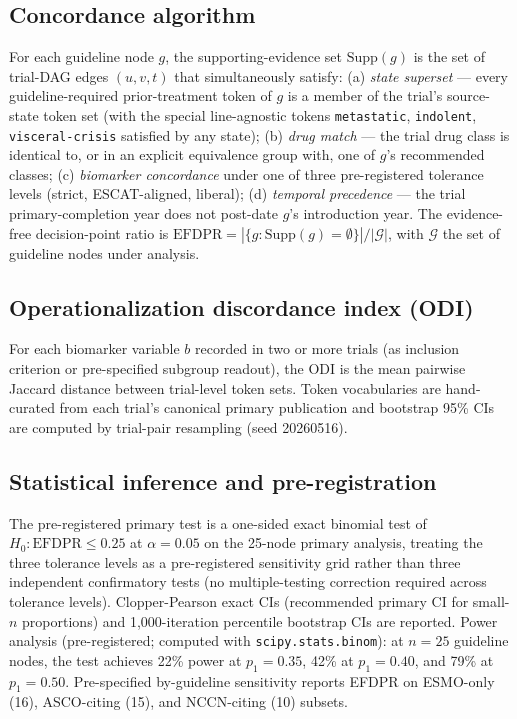 \documentclass[11pt,a4paper]{article}
\begin{document}
\subsection{Concordance algorithm}
For each guideline node $g$, the supporting-evidence set $\mathrm{Supp}(g)$ is the set of trial-DAG edges $(u, v, t)$ that simultaneously satisfy: (a) \emph{state superset} --- every guideline-required prior-treatment token of $g$ is a member of the trial's source-state token set (with the special line-agnostic tokens \texttt{metastatic}, \texttt{indolent}, \texttt{visceral-crisis} satisfied by any state); (b) \emph{drug match} --- the trial drug class is identical to, or in an explicit equivalence group with, one of $g$'s recommended classes; (c) \emph{biomarker concordance} under one of three pre-registered tolerance levels (strict, ESCAT-aligned, liberal); (d) \emph{temporal precedence} --- the trial primary-completion year does not post-date $g$'s introduction year. The evidence-free decision-point ratio is $\mathrm{EFDPR} = |\{g : \mathrm{Supp}(g) = \emptyset\}| / |\mathcal{G}|$, with $\mathcal{G}$ the set of guideline nodes under analysis.

\subsection{Operationalization discordance index (ODI)}
For each biomarker variable $b$ recorded in two or more trials (as inclusion criterion or pre-specified subgroup readout), the ODI is the mean pairwise Jaccard distance between trial-level token sets. Token vocabularies are hand-curated from each trial's canonical primary publication and bootstrap 95\% CIs are computed by trial-pair resampling (seed 20260516).

\subsection{Statistical inference and pre-registration}
The pre-registered primary test is a one-sided exact binomial test of $H_0: \mathrm{EFDPR} \le 0.25$ at $\alpha = 0.05$ on the 25-node primary analysis, treating the three tolerance levels as a pre-registered sensitivity grid rather than three independent confirmatory tests (no multiple-testing correction required across tolerance levels). Clopper-Pearson exact CIs (recommended primary CI for small-$n$ proportions) and 1,000-iteration percentile bootstrap CIs are reported. Power analysis (pre-registered; computed with \texttt{scipy.stats.binom}): at $n=25$ guideline nodes, the test achieves 22\% power at $p_1=0.35$, 42\% at $p_1=0.40$, and 79\% at $p_1=0.50$. Pre-specified by-guideline sensitivity reports EFDPR on ESMO-only (16), ASCO-citing (15), and NCCN-citing (10) subsets.
\end{document}
